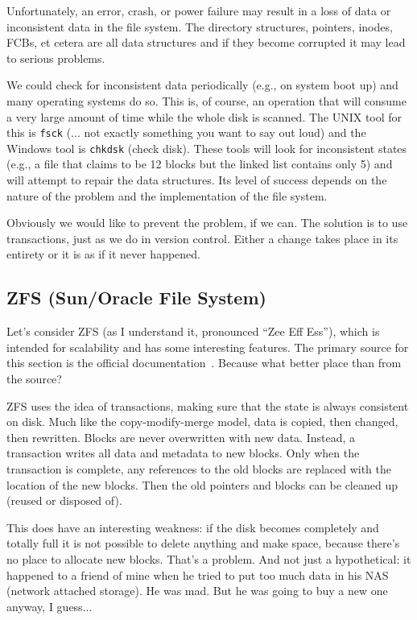 Unfortunately, an error, crash, or power failure may result in a loss of data or inconsistent data in the file system. The directory structures, pointers, inodes, FCBs, et cetera are all data structures and if they become corrupted it may lead to serious problems.

We could check for inconsistent data periodically (e.g., on system boot up) and many operating systems do so. This is, of course, an operation that will consume a very large amount of time while the whole disk is scanned. The UNIX tool for this is \texttt{fsck} (... not exactly something you want to say out loud) and the Windows tool is \texttt{chkdsk} (check disk). These tools will look for inconsistent states (e.g., a file that claims to be 12 blocks but the linked list contains only 5) and will attempt to repair the data structures. Its level of success depends on the nature of the problem and the implementation of the file system.

Obviously we would like to prevent the problem, if we can. The solution is to use transactions, just as we do in version control. Either a change takes place in its entirety or it is as if it never happened.


\subsection*{ZFS (Sun/Oracle File System)}
Let's consider ZFS (as I understand it, pronounced ``Zee Eff Ess''), which is intended for scalability and has some interesting features. The primary source for this section is the official documentation~\cite{zfs}. Because what better place than from the source?

ZFS uses the idea of transactions, making sure that the state is always consistent on disk. Much like the copy-modify-merge model, data is copied, then changed, then rewritten. Blocks are never overwritten with new data. Instead, a transaction writes all data and metadata to new blocks. Only when the transaction is complete, any references to the old blocks are replaced with the location of the new blocks. Then the old pointers and blocks can be cleaned up (reused or disposed of).

This does have an interesting weakness: if the disk becomes completely and totally full it is not possible to delete anything and make space, because there's no place to allocate new blocks. That's a problem. And not just a hypothetical: it happened to a friend of mine when he tried to put too much data in his NAS (network attached storage). He was mad. But he was going to buy a new one anyway, I guess...

